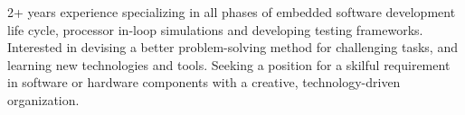 
\begin{cvparagraph}
2+ years experience specializing in all phases of embedded software development life cycle, processor in-loop simulations and developing testing frameworks. Interested in devising a better problem-solving method for challenging tasks, and learning new technologies and tools. Seeking a position for a skilful requirement in software or hardware components with a creative, technology-driven organization.
\end{cvparagraph}
